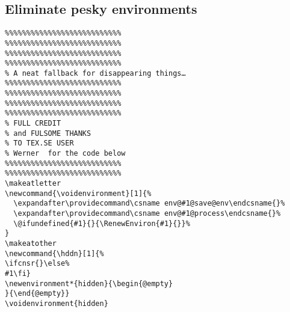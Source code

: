 \documentclass{article}
\begin{document}
\subsection{Eliminate pesky environments}
\begin{verbatim}
%%%%%%%%%%%%%%%%%%%%%%%%%%%
%%%%%%%%%%%%%%%%%%%%%%%%%%%
%%%%%%%%%%%%%%%%%%%%%%%%%%%
%%%%%%%%%%%%%%%%%%%%%%%%%%%
% A neat fallback for disappearing things…
%%%%%%%%%%%%%%%%%%%%%%%%%%%
%%%%%%%%%%%%%%%%%%%%%%%%%%%
%%%%%%%%%%%%%%%%%%%%%%%%%%%
%%%%%%%%%%%%%%%%%%%%%%%%%%%
% FULL CREDIT
% and FULSOME THANKS
% TO TEX.SE USER
% Werner  for the code below
%%%%%%%%%%%%%%%%%%%%%%%%%%%
%%%%%%%%%%%%%%%%%%%%%%%%%%%
\makeatletter
\newcommand{\voidenvironment}[1]{%
  \expandafter\providecommand\csname env@#1@save@env\endcsname{}%
  \expandafter\providecommand\csname env@#1@process\endcsname{}%
  \@ifundefined{#1}{}{\RenewEnviron{#1}{}}%
}
\makeatother
\newcommand{\hddn}[1]{%
\ifcnsr{}\else%
#1\fi}
\newenvironment*{hidden}{\begin{@empty}
}{\end{@empty}}
\voidenvironment{hidden}

\end{verbatim}
\end{document}
